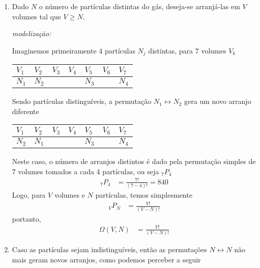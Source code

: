 \begin{sol}
	\begin{enumerate}[label=\alph *)]
		\item Dado $N$ o número de partículas distintas do gás, deseja-se arranjá-las em $V$ volumes tal que $V\geq N$.
		
		\par\noindent\emph{modelização:}

		Imaginemos primeiramente 4 partículas $N_j$ distintas, para 7 volumes $V_k$

		\begin{table}[!ht]
			\centering
			\begin{tabular}{|l|l|l|l|l|l|l|}
			\hline
			$V_1$ & $V_2$ & $V_3$ & $V_4$ & $V_5$ & $V_6$ & $V_7$ \\ \hline
			$N_1$ & $N_2$ &       &       & $N_3$ &       & $N_4$ \\ \hline
			\end{tabular}
		\end{table}
		Sendo partículas distinguíveis, a permutação $N_1\longleftrightarrow N_2$ gera um novo arranjo diferente

		\begin{table}[!ht]
			\centering
			\begin{tabular}{|l|l|l|l|l|l|l|}
			\hline
			$V_1$ & $V_2$ & $V_3$ & $V_4$ & $V_5$ & $V_6$ & $V_7$ \\ \hline
			$N_2$ & $N_1$ &       &       & $N_3$ &       & $N_4$ \\ \hline
			\end{tabular}
		\end{table}
		Neste caso, o número de arranjos distintos é dado pela permutação simples de 7 volumes tomados a cada 4 partículas, ou seja $_7P_4$
		\begin{align}
			_7P_4&=\frac{7!}{(7-4)!}=840
		\end{align}
		Logo, para $V$ volumes e $N$ partículas, temos simplesmente
		\begin{align}
			_VP_N&=\frac{V!}{(V-N)!}
		\end{align}
		portanto,
		\begin{align}
			\Omega (V,N)&=\frac{V!}{(V-N)!}
		\end{align}
			\item Caso as partículas sejam indistinguíveis, então as permutações $N\longleftrightarrow N$ não mais geram novos arranjos, como podemos perceber a seguir
			

\end{enumerate}
\end{sol}
